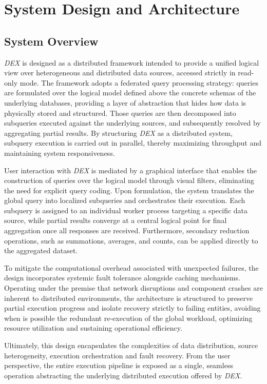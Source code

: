 \chapter{System Design and Architecture}

\section{System Overview}

\textit{DEX} is designed as a distributed framework intended to provide a
unified logical view over heterogeneous and distributed data sources, accessed
strictly in read-only mode. The framework adopts a federated query processing
strategy: queries are formulated over the logical model defined above the
concrete schemas of the underlying databases, providing a layer of abstraction
that hides how data is physically stored and structured. Those queries are then
decomposed into subqueries executed against the underlying sources, and
subsequently resolved by aggregating partial results. By structuring
\textit{DEX} as a distributed system, subquery execution is carried out in
parallel, thereby maximizing throughput and maintaining system responsiveness. 

User interaction with \textit{DEX} is mediated by a graphical interface that
enables the construction of queries over the logical model through visual
filters, eliminating the need for explicit query coding. Upon formulation, the
system translates the global query into localized subqueries and orchestrates
their execution. Each subquery is assigned to an individual worker process
targeting a specific data source, while partial results converge at a central
logical point for final aggregation once all responses are received.
Furthermore, secondary reduction operations, such as summations, averages, and
counts, can be applied directly to the aggregated dataset. 

To mitigate the computational overhead associated with unexpected failures, the
design incorporates systemic fault tolerance alongside caching mechanisms.
Operating under the premise that network disruptions and component crashes are
inherent to distributed environments, the architecture is structured to preserve
partial execution progress and isolate recovery strictly to failing entities,
avoiding when is possible the redundant re-execution of the global workload,
optimizing resource utilization and sustaining operational efficiency.  

Ultimately, this design encapsulates the complexities of data distribution,
source heterogeneity, execution orchestration and fault recovery. From the user
perspective, the entire execution pipeline is exposed as a single, seamless
operation abstracting the underlying distributed execution offered by
\textit{DEX}. 
